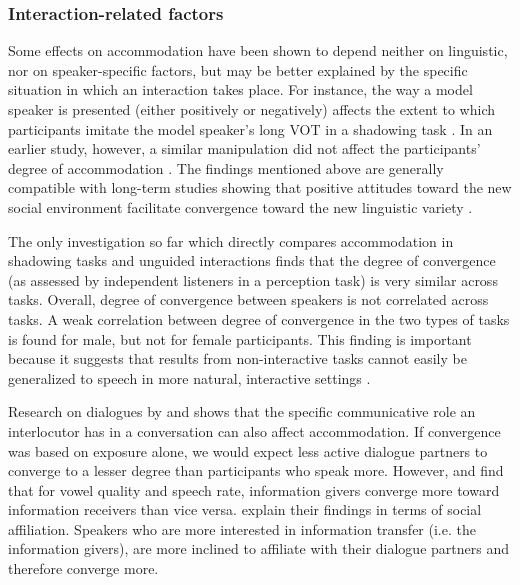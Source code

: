 \documentclass[output=paper]{langscibook}
\begin{document}
\subsubsection{Interaction-related factors}

Some effects on accommodation have been shown to depend neither on linguistic, nor on speaker-specific factors, but may be better explained by the specific situation in which an interaction takes place. 
For instance, the way a model speaker is presented (either positively or negatively) affects the extent to which participants imitate the model speaker's long VOT in a shadowing task \citep{yu_phonetic_2013}. In an earlier study, however, a similar manipulation did not affect the participants' degree of accommodation \citep{babel_dialect_2010}. The findings mentioned above are generally compatible with long-term studies showing that  positive attitudes toward the new social environment facilitate convergence toward the new linguistic variety \citep{werlen_zwischen_2006,macleod_effect_2012,pardo_phonetic_2012}.

The only investigation so far which directly compares accommodation in shadowing tasks and unguided interactions \parencite{pardo_comparison_2018} finds that the degree of convergence (as assessed by independent listeners in a perception task) is very similar across tasks. Overall, degree of convergence between speakers is not correlated across tasks. A weak correlation between degree of convergence in the two types of tasks is found for male, but not for female participants. This finding is important because it suggests that results from non-interactive tasks cannot easily be generalized to speech in more natural, interactive settings \citep{pardo_comparison_2018}. 

Research on dialogues by \textcite{pardo_phonetic_2006} and \textcite{pardo_phonetic_2013} shows that the specific communicative role an interlocutor has in a conversation can also affect accommodation. If convergence was based on exposure alone, we would expect less active dialogue partners to converge to a lesser degree than participants who speak more. However, \textcite{pardo_phonetic_2006} and \textcite{pardo_phonetic_2013} find that for vowel quality and speech rate, information givers converge more toward information receivers than vice versa. \textcite{pardo_phonetic_2013} explain their findings in terms of social affiliation. Speakers who are more interested in information transfer (i.e. the information givers), are more inclined to affiliate with their dialogue partners and therefore converge more.
\end{document}
